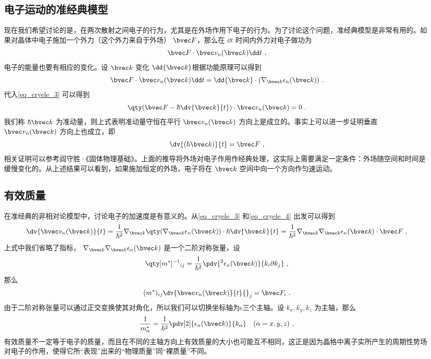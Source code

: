 \subsection{电子运动的准经典模型}
现在我们希望讨论的是，在两次散射之间电子的行为，尤其是在外场作用下电子的行为。为了讨论这个问题，准经典模型是非常有用的。如果对晶体中电子施加一个外力（这个外力来自于外场） $\bvec F$，那么在 $\dd t$ 时间内外力对电子做功为
\begin{equation}
\bvec F\cdot \bvec v_n(\bvec k)\dd t~,
\end{equation}
电子的能量也要有相应的变化。设 $\bvec k$ 变化 $\dd{\bvec k}$根据功能原理可以得到
\begin{equation}
\bvec F\cdot \bvec v_n(\bvec k)\dd t
=\dd {\bvec k}\cdot (\nabla_{\bvec k}\epsilon_n(\bvec k))~.
\end{equation}
代入\autoref{eq_cryele_3} 可以得到
\begin{equation}
\qty(\bvec F-\hbar\dv{\bvec k}{t})\cdot \bvec v_n(\bvec k)=0~.
\end{equation}
我们称 $\hbar \bvec k$ 为准动量，则上式表明准动量守恒在平行 $\bvec v_n(\bvec k)$ 方向上是成立的。事实上可以进一步证明垂直 $\bvec v_n(\bvec k)$ 方向上也成立，即
\begin{equation}\label{eq_cryele_4}
\dv{(\hbar \bvec k)}{t}=\bvec F~,
\end{equation}
相关证明可以参考阎守胜·《固体物理基础》\cite{阎守胜}。上面的推导将外场对电子作用作经典处理，这实际上需要满足一定条件：外场随空间和时间是缓慢变化的。从上述结果可以看到，如果施加恒定的外场，电子将在 $\bvec k$ 空间中向一个方向作匀速运动。
\subsection{有效质量}
在准经典的非相对论模型中，讨论电子的加速度是有意义的。从\autoref{eq_cryele_3} 和\autoref{eq_cryele_4} 出发可以得到
\begin{equation}
\dv{\bvec v_n(\bvec k)}{t}=\frac{1}{\hbar^2}\nabla_{\bvec k}\qty(\nabla_{\bvec k}\epsilon_n(\bvec k) )\cdot \hbar\dv{\bvec k}{t}=\frac{1}{\hbar^2}\nabla_{\bvec k}\nabla_{\bvec k}\epsilon_n(\bvec k) \cdot \bvec F~,
\end{equation}
上式中我们省略了指标， $\nabla_{\bvec k}\nabla_{\bvec k}\epsilon_n(\bvec k)$ 是一个二阶对称张量，设
\begin{equation}
\qty[m^{*}]^{-1}{}_{ij}=\frac{1}{\hbar^2}\pdv{{}^2\epsilon_n(\bvec k)}{k_i\partial k_j} ~,
\end{equation}
那么
\begin{equation}
(m^*)_{ij}\dv{\bvec v_n(\bvec k)}{t}{}_j=\bvec F_i~.
\end{equation}
由于二阶对称张量可以通过正交变换使其对角化，所以我们可以切换坐标轴为s三个主轴。设 $k_x,k_y,k_z$ 为主轴，那么
\begin{equation}\label{eq_cryele_5}
\frac{1}{m_\alpha^*}=\frac{1}{\hbar^2}\pdv[2]{\epsilon_n(\bvec k)}{k_\alpha} \quad (\alpha=x,y,z)~.
\end{equation}
有效质量不一定等于电子的质量，而且在不同的主轴方向上有效质量的大小也可能互不相同，这正是因为晶格中离子实所产生的周期性势场对电子的作用，使得它所“表现”出来的“物理质量”同“裸质量”不同。

